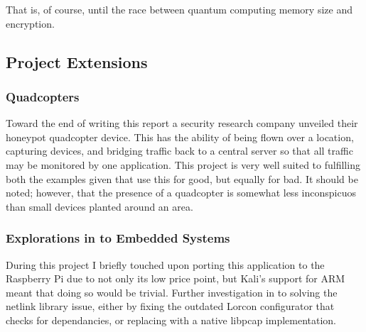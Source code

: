 That is, of course, until the race between quantum computing memory size and encryption.

\subsection{Project Extensions}
\subsubsection{Quadcopters}
Toward the end of writing this report a security research company unveiled their honeypot quadcopter device. This has the ability of being flown over a location, capturing devices, and bridging traffic back to a central server so that all traffic may be monitored by one application. This project is very well suited to fulfilling both the examples given that use this for good, but equally for bad. It should be noted; however, that the presence of a quadcopter is somewhat less inconspicuos than small devices planted around an area. 

\subsubsection{Explorations in to Embedded Systems}
During this project I briefly touched upon porting this application to the Raspberry Pi due to not only its low price point, but Kali's support for ARM meant that doing so would be trivial. Further investigation in to solving the netlink library issue, either by fixing the outdated Lorcon configurator that checks for dependancies, or replacing with a native libpcap implementation.


\clearpage
